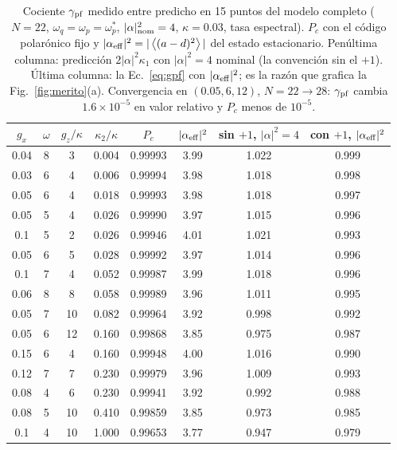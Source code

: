 \documentclass[11pt,a4paper]{article}
\newcommand{\ave}[1]{\left\langle#1\right\rangle}
\newcommand{\wps}{\omega_p^{*}}
\theoremstyle{definition}
\begin{document}
\begin{table}[h]
\centering
\begin{tabular}{cccccccc}
\toprule
$g_x$ & $\omega$ & $g_z/\kappa$ & $\kappa_2/\kappa$ & $P_c$ & $|\alpha_{\rm eff}|^2$ & sin $+1$, $|\alpha|^2=4$ & con $+1$, $|\alpha_{\rm eff}|^2$\\
\midrule
0.04 & 8 & 3 & 0.004 & 0.99993 & 3.99 & 1.022 & 0.999\\
0.03 & 6 & 4 & 0.006 & 0.99994 & 3.98 & 1.018 & 0.998\\
0.05 & 6 & 4 & 0.018 & 0.99993 & 3.98 & 1.018 & 0.997\\
0.05 & 5 & 4 & 0.026 & 0.99990 & 3.97 & 1.015 & 0.996\\
0.1 & 5 & 2 & 0.026 & 0.99946 & 4.01 & 1.021 & 0.993\\
0.05 & 6 & 5 & 0.028 & 0.99992 & 3.97 & 1.014 & 0.996\\
0.1 & 7 & 4 & 0.052 & 0.99987 & 3.99 & 1.018 & 0.996\\
0.06 & 8 & 8 & 0.058 & 0.99989 & 3.96 & 1.011 & 0.995\\
0.05 & 7 & 10 & 0.082 & 0.99964 & 3.92 & 0.998 & 0.992\\
0.05 & 6 & 12 & 0.160 & 0.99868 & 3.85 & 0.975 & 0.987\\
0.15 & 6 & 4 & 0.160 & 0.99948 & 4.00 & 1.016 & 0.990\\
0.12 & 7 & 7 & 0.230 & 0.99979 & 3.96 & 1.009 & 0.993\\
0.08 & 4 & 6 & 0.230 & 0.99941 & 3.92 & 0.992 & 0.988\\
0.08 & 5 & 10 & 0.410 & 0.99859 & 3.85 & 0.973 & 0.985\\
0.1 & 4 & 10 & 1.000 & 0.99653 & 3.77 & 0.947 & 0.979\\
\bottomrule
\end{tabular}
\caption{Cociente $\gamma_{\rm pf}$ medido entre predicho en 15 puntos del modelo completo ($N=22$, $\omega_q=\omega_p=\wps$, $|\alpha|^2_{\rm nom}=4$, $\kappa=0.03$, tasa espectral). $P_c$ con el código polarónico fijo y $|\alpha_{\rm eff}|^2=|\ave{(a-d)^2}|$ del estado estacionario. Penúltima columna: predicción $2|\alpha|^2\kappa_1$ con $|\alpha|^2=4$ nominal (la convención sin el $+1$). Última columna: la Ec.~\eqref{eq:gpf} con $|\alpha_{\rm eff}|^2$; es la razón que grafica la Fig.~\ref{fig:merito}(a). Convergencia en $(0.05,6,12)$, $N=22\to28$: $\gamma_{\rm pf}$ cambia $1.6\times10^{-5}$ en valor relativo y $P_c$ menos de $10^{-5}$.}
\label{tab:V4}
\end{table}
\end{document}
